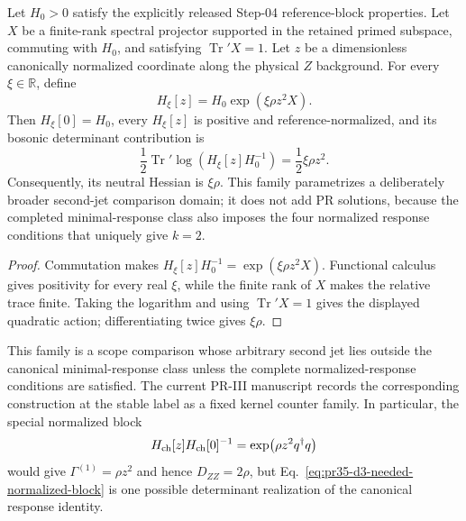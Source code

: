 \begin{theorem}
\label{thm:pr35-d3-determinant-counterfamily}
Let $H_0>0$ satisfy the explicitly released Step-04 reference-block properties.  Let $X$ be a finite-rank spectral projector supported in the retained primed subspace, commuting with $H_0$, and satisfying $\operatorname{Tr}'X=1$.  Let $z$ be a dimensionless canonically normalized coordinate along the physical $Z$ background.  For every $\xi\in\mathbb R$, define
\begin{equation}
 H_\xi[z]=H_0\exp(\xi\rho z^2X).
 \label{eq:pr35-d3-determinant-counterblock}
\end{equation}
Then $H_\xi[0]=H_0$, every $H_\xi[z]$ is positive and reference-normalized, and its bosonic determinant contribution is
\begin{equation}
 \frac12\operatorname{Tr}'\log
 \left(H_\xi[z]H_0^{-1}\right)
 =\frac12\xi\rho z^2.
\end{equation}
Consequently, its neutral Hessian is $\xi\rho$.  This family parametrizes a deliberately broader second-jet comparison domain; it does not add PR solutions, because the completed minimal-response class also imposes the four normalized response conditions that uniquely give $k=2$.
\end{theorem}

\begin{proof}
Commutation makes
$H_\xi[z]H_0^{-1}=\exp(\xi\rho z^2X)$.  Functional calculus gives positivity for every real $\xi$, while the finite rank of $X$ makes the relative trace finite.  Taking the logarithm and using
$\operatorname{Tr}'X=1$ gives the displayed quadratic action; differentiating twice gives $\xi\rho$.
\end{proof}

This family is a scope comparison whose arbitrary second jet lies outside the canonical minimal-response class unless the complete normalized-response conditions are satisfied.  The current PR-III manuscript records the corresponding construction at the stable label as a fixed kernel counter family.  In particular, the special normalized block
\begin{equation}
 H_{\rm ch}[z]H_{\rm ch}[0]^{-1}
 =\exp\!\left(\rho z^2q^\dagger q\right)
 \label{eq:pr35-d3-needed-normalized-block}
\end{equation}
would give
$\Gamma^{(1)}=\rho z^2$ and hence $D_{ZZ}=2\rho$, but
Eq.~\eqref{eq:pr35-d3-needed-normalized-block} is one possible determinant realization of the canonical response identity.

